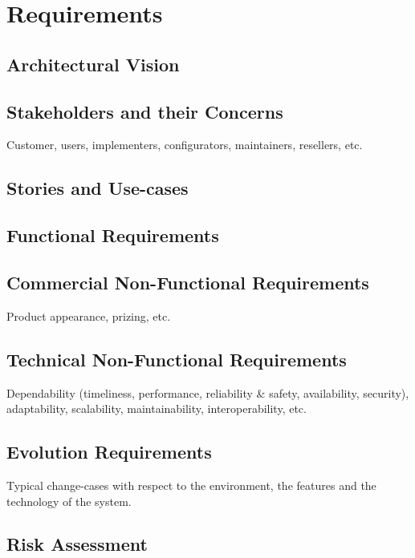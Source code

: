 \chapter{Requirements}

\section{Architectural Vision}

\section{Stakeholders and their Concerns}

Customer, users, implementers, configurators, maintainers, resellers, etc.

\section{Stories and Use-cases}

\section{Functional Requirements}

\section{Commercial Non-Functional Requirements}

Product appearance, prizing, etc.

\section{Technical Non-Functional Requirements}

Dependability (timeliness, performance, reliability \& safety, availability, security), adaptability, scalability, maintainability, interoperability, etc.

\section{Evolution Requirements}

Typical change-cases with respect to the environment, the features and the technology of the system.

\section{Risk Assessment}
